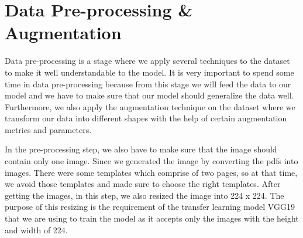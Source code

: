 \section{Data Pre-processing \& Augmentation}
Data pre-processing is a stage where we apply several techniques to the dataset to make it well understandable to the model. It is very important to spend some time in data pre-processing because from this stage we will feed the data to our model and we have to make sure that our model should generalize the data well. Furthermore, we also apply the augmentation technique on the dataset where we transform our data into different shapes with the help of certain augmentation metrics and parameters.
\newline
\par
In the pre-processing step, we also have to make sure that the image should contain only one image. Since we generated the image by converting the pdfs into images. There were some templates which comprise of two pages, so at that time, we avoid those templates and made sure to choose the right templates. After getting the images, in this step, we also resized the image into 224 x 224. The purpose of this resizing is the requirement of the transfer learning model VGG19 that we are using to train the model as it accepts only the images with the height and width of 224.
